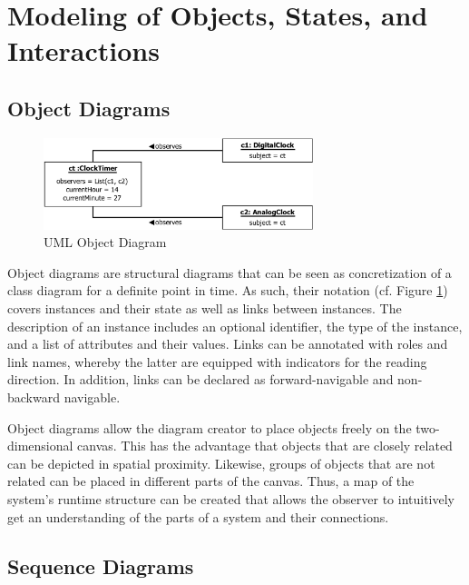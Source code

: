 \section{Modeling of Objects, States, and Interactions}
\label{s:BackgroundModeling}

\subsection{Object Diagrams}
\label{ss:BackgroundModelingObject}

\begin{figure}
	\centering
	\includegraphics[width=0.7\textwidth]{../images/02-Object}
	\caption[TOC Caption]{UML Object Diagram}
	\label{fig:BackgroundModelingObject}
\end{figure}

Object diagrams \cite{rumbaugh_unified_2010} are structural diagrams that can be seen as concretization of a class diagram for a definite point in time.
As such, their notation (cf. Figure \ref{fig:BackgroundModelingObject}) covers instances and their state as well as links between instances.
The description of an instance includes an optional identifier, the type of the instance, and a list of attributes and their values.
Links can be annotated with roles and link names, whereby the latter are equipped with indicators for the reading direction.
In addition, links can be declared as forward-navigable and non-backward navigable.

Object diagrams allow the diagram creator to place objects freely on the two-dimensional canvas.
This has the advantage that objects that are closely related can be depicted in spatial proximity.
Likewise, groups of objects that are not related can be placed in different parts of the canvas.
Thus, a map of the system's runtime structure can be created that allows the observer to intuitively get an understanding of the parts of a system and their connections.

\subsection{Sequence Diagrams}
\label{ss:BackgroundModelingSequence}

